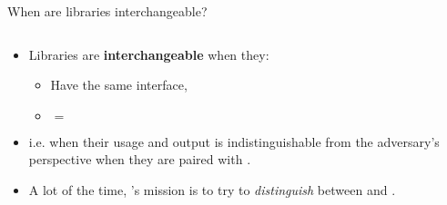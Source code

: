 \documentclass[aspectratio=169, lualatex, handout]{beamer}
\begin{document}
\begin{frame}{When are libraries interchangeable?}
	\begin{columns}[c]
		\begin{column}{0.55\textwidth}
			\begin{itemize}
				\item Libraries are \textbf{interchangeable} when they:
				      \begin{itemize}
					      \item Have the same interface,
					      \item {} $=$ 
				      \end{itemize}
				\item i.e. when their usage and output is indistinguishable from the adversary's perspective when they are paired with \prog{}.
				\item A lot of the time, \prog{}'s mission is to try to \textit{distinguish} between  and .
			\end{itemize}
		\end{column}
		\begin{column}{0.45\textwidth}
			\begin{flushright}
			\end{flushright}
		\end{column}
	\end{columns}
\end{frame}
\end{document}
